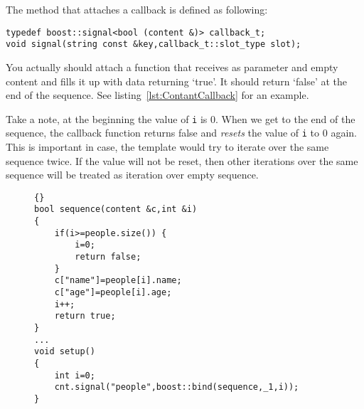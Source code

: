 \documentclass{article}
\newcommand{\tw}[1]{\texttt{#1}}
\begin{document}
The method that attaches a callback is defined as following:

\begin{verbatim}
typedef boost::signal<bool (content &)> callback_t;
void signal(string const &key,callback_t::slot_type slot);
\end{verbatim}

You actually should attach a function that receives as parameter and empty content and fills it up with data returning `true'. It should return `false' at the end of the sequence. See listing~\ref{lst:ContantCallback} for an example.

Take a note, at the beginning the value of \tw{i} is 0. When we get to the end of the sequence, the callback function returns
false and \emph{resets} the value of \tw{i} to 0 again. This is important in case, the template would try to iterate
over the same sequence twice. If the value will not be reset, then other iterations over the same sequence will be
treated as iteration over empty sequence.

\begin{figure}
\begin{lstlisting}[label=lst:ContantCallback,caption=Creating a Sequence With Callback]{}
bool sequence(content &c,int &i)
{
	if(i>=people.size()) {
		i=0;
		return false;
	}
	c["name"]=people[i].name;
	c["age"]=people[i].age;
	i++;
	return true;
}
...
void setup()
{
	int i=0;
	cnt.signal("people",boost::bind(sequence,_1,i));
}
\end{lstlisting}

\end{figure}
\end{document}
